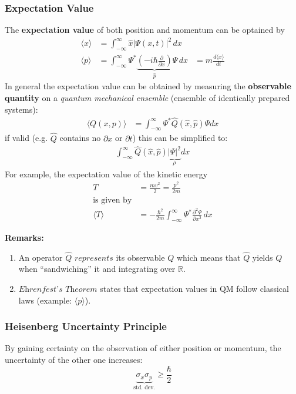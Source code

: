 \subsubsection{Expectation Value}
The \textbf{expectation value} of both position and momentum can be optained by
\begin{align*}
    \langle x \rangle & = \int_{-\infty}^{\infty} \hat{x} |\Psi(x,t)|^2 \, dx                                                                                                         \\
    \langle p \rangle & = \int_{-\infty}^{\infty} \Psi^* \underbrace{\left(-i\hbar \frac{\partial}{\partial x}\right)}_{\hat{p}} \Psi \, dx & = m \frac{d\langle x \rangle}{dt}
\end{align*}
In general the expectation value can be obtained by measuring the \textbf{observable quantity} on a \textit{quantum mechanical ensemble} (ensemble of identically prepared systems):
\begin{align*}
    \langle Q(x,p)\rangle & = \int_{-\infty}^{\infty}\Psi^*\hat{Q}(\hat{x},\hat{p})\Psi dx
\end{align*}
if valid (e.g. $\hat{Q}$ contains no $\partial{x}$ or $\partial{t}$) this can be simplified to:\\
\begin{align*}
    \int_{-\infty}^{\infty}\hat{Q}(\hat{x},\hat{p}) \underbrace{|\Psi|^2}_{\rho} dx
\end{align*}
For example, the expectation value of the kinetic energy
\begin{align*}
    T                 & =\frac{mv^2}{2}=\frac{p^2}{2m}                                                             \\
    \text{is given by}                                                                                             \\
    \langle T \rangle & = -\frac{\hbar^2}{2m}\int_{-\infty}^{\infty}\Psi^*\frac{\partial^2\Psi}{\partial x^2} \,dx
\end{align*}

\textbf{Remarks:}
\begin{enumerate}
    \item An operator $\hat{Q}$ $\textit{represents}$ its observable $Q$ which means that $\hat{Q}$ yields $Q$ when ``sandwiching'' it and integrating over $\mathbb{R}$.
    \item $\textit{Ehrenfest's Theorem}$ states that expectation values in QM follow classical laws (example: $\langle p \rangle$).
\end{enumerate}

\subsubsection{Heisenberg Uncertainty Principle}
By gaining certainty on the observation of either position or momentum, the uncertainty of the other one increases:
\begin{equation*}
    \underbrace{\sigma_x\sigma_p}_{\text{std.\ dev.}} \geq \frac{\hbar}{2}
\end{equation*}


